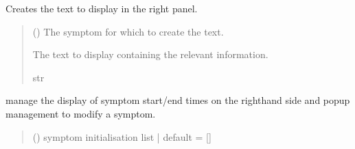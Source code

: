 \documentclass[letterpaper,10pt,english]{sphinxmanual}
\begin{document}
\begin{fulllineitems}
\begin{fulllineitems}
\label{\detokenize{general_interface:general_interface_V10.InterfaceGenerale.text_sympt}}
\pysigstartsignatures
{}
\pysigstopsignatures
\sphinxAtStartPar
Creates the text to display in the right panel.
\begin{quote}\begin{description}
\sphinxAtStartPar
{} ({\hyperref[\detokenize{annotation:annotation.class_symptome.Symptome}]{}}) \textendash{} The symptom for which to create the text.

\sphinxAtStartPar
The text to display containing the relevant information.

\sphinxAtStartPar
str

\end{description}\end{quote}

\end{fulllineitems}


\begin{fulllineitems}
\label{\detokenize{general_interface:general_interface_V10.InterfaceGenerale.update_right_panel}}
\pysigstartsignatures
{}
\pysigstopsignatures
\sphinxAtStartPar
manage the display of symptom start/end times on the right\sphinxhyphen{}hand side and pop\sphinxhyphen{}up management to modify a symptom.
\begin{quote}\begin{description}
\sphinxAtStartPar
{} () \textendash{} symptom initialisation list | default = {[}{]}

\end{description}\end{quote}

\end{fulllineitems}


\end{fulllineitems}
\end{document}
